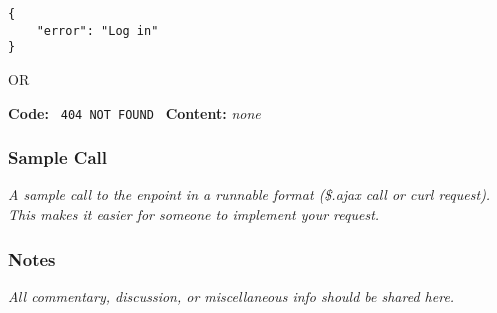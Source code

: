 		\begin{lstlisting}
{
	"error": "Log in"
}
		\end{lstlisting}

		OR

		\textbf{Code:} \verb| 404 NOT FOUND |
		\textbf{Content:} \textit{none}

	\subsubsection{Sample Call}
		\textit{A sample call to the enpoint in a runnable format (\$.ajax call or curl request). This makes it easier for someone to implement your request.}

	\subsubsection{Notes}
		\textit{All commentary, discussion, or miscellaneous info should be shared here.}